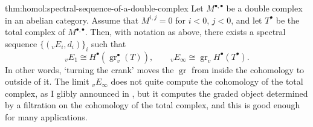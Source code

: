 \begin{thm}{}{thm:homol:spectral-sequence-of-a-double-complex}
  Let $M^{\bullet,\bullet}$ be a double complex in an abelian
  category. Assume that $M^{i,j} = 0$ for $i < 0$, $j < 0$, and let
  $T^\bullet$ be the total complex of $M^{\bullet,\bullet}$. Then,
  with notation as above, there exists a spectral sequence
  $\{({}_vE_i, d_i)\}_i$ such that
  \[ {}_vE_1 \cong H^\bullet(\operatorname{gr}_v^\bullet(T)), \qquad
    {}_vE_\infty \cong \operatorname{gr}_v H^\bullet(T^\bullet).
  \]
  In other words, `turning the crank' moves the $\operatorname{gr}$
  from inside the cohomology to outside of it. The limit
  ${}_vE_\infty$ does not quite compute the cohomology of the total
  complex, as I glibly announced in
  , but it
  computes the graded object determined by a filtration on the
  cohomology of the total complex, and this is good enough for many
  applications.
\end{thm}
